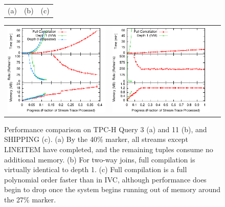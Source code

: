 \begin{figure}
\begin{center}
\begin{minipage}{\textwidth}
\begin{tabular}{ccc}
(a) & (b) & (c)
\end{tabular}
\caption{Performance comparison on TPC-H Query 3 (a) and 11 (b), and SHIPPING (c). (a) By the 40\% marker, all streams except LINEITEM have completed, and the remaining tuples consume no additional memory.  (b) For two-way joins, full compilation is virtually identical to depth 1.  (c) Full compilation is a full polynomial order faster than in IVC, although performance does begin to drop once the system begins running out of memory around the 27\% marker.}
\label{fig:experiments:tpch3}
\label{fig:experiments:tpch11}
\label{fig:experiments:ssb4}
\end{minipage}

\vspace*{0.2in}

\begin{minipage}{\textwidth}
\begin{tabular}{ccc}
\includegraphics[width=\figurewidth]{../graphs/graphs/unified_tpch17.pdf} &
\includegraphics[width=\figurewidth]{../graphs/graphs/unified_tpch22.pdf} &

\end{tabular}
\end{minipage}
\end{center}
\end{figure}
